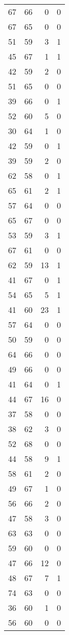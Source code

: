 \begin{tabular}{rrrr}
 67 &  66 &  0 &  0 \\
 67 &  65 &  0 &  0 \\
 51 &  59 &  3 &  1 \\
 45 &  67 &  1 &  1 \\
 42 &  59 &  2 &  0 \\
 51 &  65 &  0 &  0 \\
 39 &  66 &  0 &  1 \\
 52 &  60 &  5 &  0 \\
 30 &  64 &  1 &  0 \\
 42 &  59 &  0 &  1 \\
 39 &  59 &  2 &  0 \\
 62 &  58 &  0 &  1 \\
 65 &  61 &  2 &  1 \\
 57 &  64 &  0 &  0 \\
 65 &  67 &  0 &  0 \\
 53 &  59 &  3 &  1 \\
 67 &  61 &  0 &  0 \\
 62 &  59 & 13 &  1 \\
 41 &  67 &  0 &  1 \\
 54 &  65 &  5 &  1 \\
 41 &  60 & 23 &  1 \\
 57 &  64 &  0 &  0 \\
 50 &  59 &  0 &  0 \\
 64 &  66 &  0 &  0 \\
 49 &  66 &  0 &  0 \\
 41 &  64 &  0 &  1 \\
 44 &  67 & 16 &  0 \\
 37 &  58 &  0 &  0 \\
 38 &  62 &  3 &  0 \\
 52 &  68 &  0 &  0 \\
 44 &  58 &  9 &  1 \\
 58 &  61 &  2 &  0 \\
 49 &  67 &  1 &  0 \\
 56 &  66 &  2 &  0 \\
 47 &  58 &  3 &  0 \\
 63 &  63 &  0 &  0 \\
 59 &  60 &  0 &  0 \\
 47 &  66 & 12 &  0 \\
 48 &  67 &  7 &  1 \\
 74 &  63 &  0 &  0 \\
 36 &  60 &  1 &  0 \\
 56 &  60 &  0 &  0 \\

\end{tabular}

